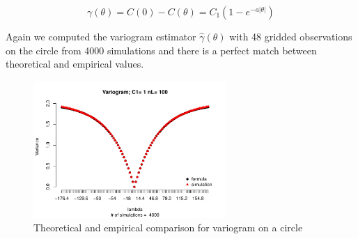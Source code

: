 \[
	\gamma(\theta) = C(0) - C(\theta) = C_1(1-e^{-a|\theta|})
\]

Again we computed the variogram estimator $\hat{\gamma}(\theta)$ with 48 gridded observations on the circle from 4000 simulations and there is a perfect match between theoretical and empirical values.


\begin{figure}[H]
	\centering
	\includegraphics[width=0.65\textwidth]{graphs/variogram_plot_4000}
	\caption {Theoretical and empirical comparison for variogram on a circle}
\end{figure}

